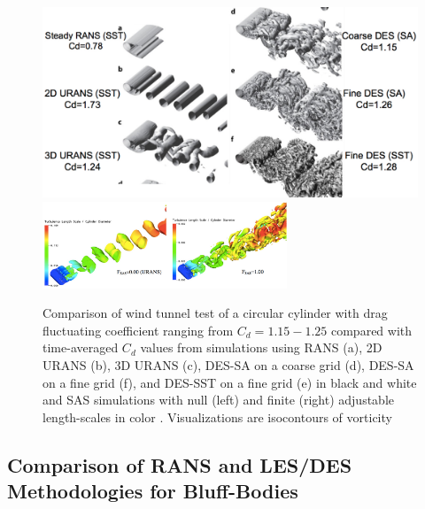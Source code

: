 \documentclass[journal]{new-aiaa}
\begin{document}
\begin{figure}[H]
\begin{center}
\includegraphics[width=1.0\textwidth]{Images/logan/spalart2009detachededdy_cylindersCD.pdf}
\includegraphics[width=0.65\textwidth]{Images/logan/menter2005scaleadaptive_cylinderwake.pdf}
\caption{ Comparison of wind tunnel test of a circular cylinder with drag fluctuating coefficient ranging from $C_d=1.15-1.25$ compared with time-averaged $C_d$ values from simulations using RANS (a), 2D URANS (b), 3D URANS (c), DES-SA on a coarse grid (d), DES-SA on a fine grid (f), and DES-SST on a fine grid (e) \cite{spalart2009detachededdy} in black and white and SAS simulations with null (left) and finite (right) adjustable length-scales in color \cite{menter2005scaleadaptive}. Visualizations are isocontours of vorticity }
\label{fig:cylinderturbmodels}
\end{center}
\end{figure}









\subsection{Comparison of RANS and LES/DES Methodologies for Bluff-Bodies} \label{subsec:desvsrans}
\end{document}
